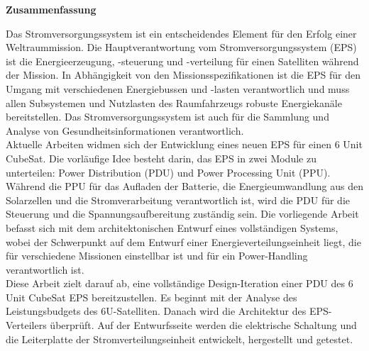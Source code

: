 \thispagestyle{empty}
\vspace*{0.2cm}

\begin{center}
    \textbf{Zusammenfassung}
\end{center}

\vspace*{0.2cm}

\noindent 
Das Stromversorgungssystem ist ein entscheidendes Element für den Erfolg einer Weltraummission. Die Hauptverantwortung vom Stromversorgungssystem (EPS) ist die Energieerzeugung, -steuerung und -verteilung für einen Satelliten während der Mission. In Abhängigkeit von den Missionsspezifikationen ist die EPS für den Umgang mit verschiedenen Energiebussen und -lasten verantwortlich und muss allen Subsystemen und Nutzlasten des Raumfahrzeugs robuste Energiekanäle bereitstellen. Das Stromversorgungssystem ist auch für die Sammlung und Analyse von Gesundheitsinformationen verantwortlich.
\\

Aktuelle Arbeiten widmen sich der Entwicklung eines neuen EPS für einen 6 Unit CubeSat. Die vorläufige Idee besteht darin, das EPS in zwei Module zu unterteilen: Power Distribution (PDU) und Power Processing Unit (PPU). Während die PPU für das Aufladen der Batterie, die Energieumwandlung aus den Solarzellen und die Stromverarbeitung verantwortlich ist, wird die PDU für die Steuerung und die Spannungsaufbereitung zuständig sein. Die vorliegende Arbeit befasst sich mit dem architektonischen Entwurf eines vollständigen Systems, wobei der Schwerpunkt auf dem Entwurf einer Energieverteilungseinheit liegt, die für verschiedene Missionen einstellbar ist und für ein Power-Handling verantwortlich ist.
\\

Diese Arbeit zielt darauf ab, eine vollständige Design-Iteration einer PDU des 6 Unit CubeSat EPS bereitzustellen. Es beginnt mit der Analyse des Leistungsbudgets des 6U-Satelliten. Danach wird die Architektur des EPS-Verteilers überprüft. Auf der Entwurfsseite werden die elektrische Schaltung und die Leiterplatte der Stromverteilungseinheit entwickelt, hergestellt und getestet.